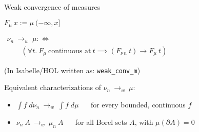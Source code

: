 \documentclass[usepdftitle=false]{beamer}
\begin{document}
\begin{frame}{Weak convergence of measures} %

\begin{definition}%
\vspace{-1ex}
\begin{center}%
$ F_\mu~x := \mu~(-\infty, x] $
\end{center}
\end{definition}

\begin{definition}
\begin{center} 
$ \begin{array}{l} \nu_n ~{\longrightarrow}_w~ \mu :\Leftrightarrow \\
\qquad
  (\forall t.~ F_\mu~\text{continuous at}~ t \implies
       (F_{\nu\,n}~t) \longrightarrow F_\mu~t)
  \end{array} $
\end{center}
{\small (In Isabelle/HOL written as: \texttt{weak{\_}conv{\_}m})}
\end{definition}

\begin{theorem}
Equivalent characterizations of $\nu_n ~{\longrightarrow}_w~ \mu$:
\begin{itemize}
 \item $\int f \; d\nu_n~{\longrightarrow}_w~\int f \; d\mu$ ~~ for every bounded, continuous $f$
 \item $\nu_n~A ~ {\longrightarrow}_w ~ \mu_n~A$ ~~ for all Borel sets $A$, with $\mu(\partial A) = 0$
\end{itemize}
\end{theorem}

\end{frame} %
\end{document}
